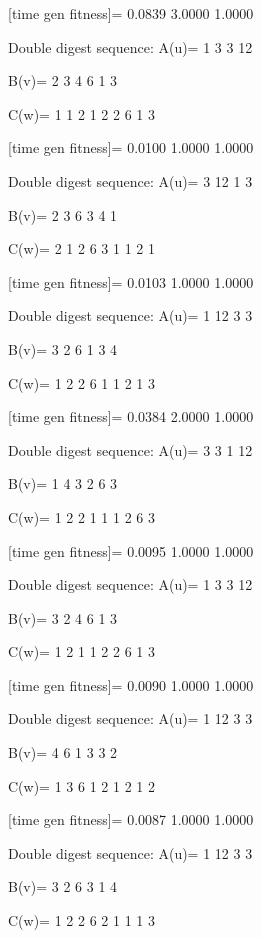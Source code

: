 [time gen fitness]=
    0.0839    3.0000    1.0000

Double digest sequence:
A(u)=
     1     3     3    12

B(v)=
     2     3     4     6     1     3

C(w)=
     1     1     2     1     2     2     6     1     3

[time gen fitness]=
    0.0100    1.0000    1.0000

Double digest sequence:
A(u)=
     3    12     1     3

B(v)=
     2     3     6     3     4     1

C(w)=
     2     1     2     6     3     1     1     2     1

[time gen fitness]=
    0.0103    1.0000    1.0000

Double digest sequence:
A(u)=
     1    12     3     3

B(v)=
     3     2     6     1     3     4

C(w)=
     1     2     2     6     1     1     2     1     3

[time gen fitness]=
    0.0384    2.0000    1.0000

Double digest sequence:
A(u)=
     3     3     1    12

B(v)=
     1     4     3     2     6     3

C(w)=
     1     2     2     1     1     1     2     6     3

[time gen fitness]=
    0.0095    1.0000    1.0000

Double digest sequence:
A(u)=
     1     3     3    12

B(v)=
     3     2     4     6     1     3

C(w)=
     1     2     1     1     2     2     6     1     3

[time gen fitness]=
    0.0090    1.0000    1.0000

Double digest sequence:
A(u)=
     1    12     3     3

B(v)=
     4     6     1     3     3     2

C(w)=
     1     3     6     1     2     1     2     1     2

[time gen fitness]=
    0.0087    1.0000    1.0000

Double digest sequence:
A(u)=
     1    12     3     3

B(v)=
     3     2     6     3     1     4

C(w)=
     1     2     2     6     2     1     1     1     3

